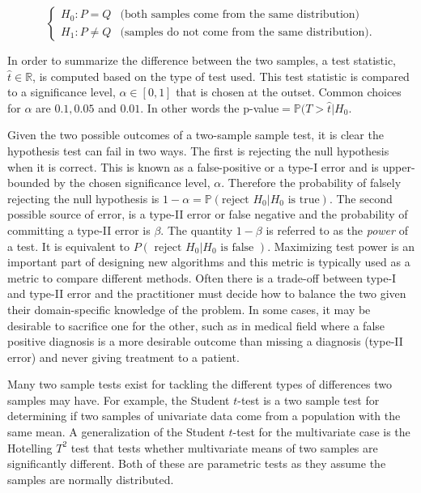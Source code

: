 \begin{equation}
  \begin{cases}
    H_0: P = Q & \text{(both samples come from the same distribution)} \\
    H_1: P \neq Q & \text{(samples do not come from the same distribution)}. 
  \end{cases}
\end{equation}

In order to summarize the difference between the two samples, a test statistic, $\hat{t} \in \mathbb{R}$, is computed based on the type of test used. This test statistic is compared to a significance level, $\alpha \in [0,1]$ that is chosen  at the outset. Common choices for $\alpha$ are $0.1, 0.05$ and $0.01$. In other words the p-value$=\mathbb{P}(T>\hat{t}|H_0$.

Given the two possible outcomes of a two-sample sample test, it is clear the hypothesis test can fail in two ways. The first is rejecting the null hypothesis when it is correct. This is known as a false-positive or a type-I error and is upper-bounded by the chosen significance level, $ \alpha$.  Therefore the probability of falsely rejecting the null hypothesis is $ 1 - \alpha = \mathbb{P}(\text{reject } H_0 | H_0 \text{ is true})$. The second possible source of error, is  a type-II error or false negative and the probability of committing a type-II error is $\beta$. The quantity $1-\beta$ is referred to as the \textit{power} of a test. It is equivalent to \(P\left(\text { reject } H_{0} | H_{0} \text { is false }\right)\). Maximizing test power is an important part of designing new algorithms and this metric is typically used as a metric to compare different methods. Often there is a trade-off  between type-I and type-II error and the practitioner must decide how to balance the two given their domain-specific knowledge of the problem. In some cases, it may be desirable to sacrifice one for the other, such as in medical field where a false positive diagnosis is a more desirable outcome than missing a diagnosis (type-II error) and never giving treatment to a patient. 

Many two sample tests exist for tackling the different types of differences two samples may have. For example, the Student $t$-test is a two sample test for determining if two samples of univariate data come from a population with the same mean. A generalization of the Student $t$-test for the multivariate case is the Hotelling $T^2$ test that tests whether multivariate means of two samples are significantly different. Both of these are parametric tests as they assume the samples are normally distributed. 

